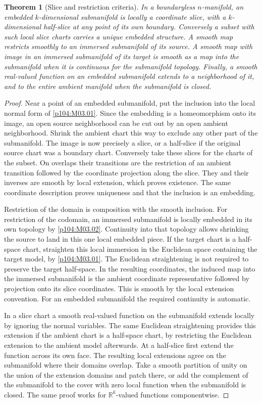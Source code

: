 \documentclass[11pt,oneside,openany]{book}
\newtheorem{theorem}{Theorem}[chapter]
\theoremstyle{definition}
\theoremstyle{remark}
\newcommand{\R}{\mathbb R}
\begin{document}
\begin{theorem}[Slice and restriction criteria]\label{p104:M03.04}
In a boundaryless \(n\)-manifold, an embedded
\(k\)-dimensional submanifold is locally a coordinate
slice, with a \(k\)-dimensional half-slice at any point
of its own boundary. Conversely a subset with such
local slice charts carries a unique embedded structure.
A smooth map restricts smoothly to an immersed
submanifold of its source. A smooth map with image in
an immersed submanifold of its target is
smooth as a map into the submanifold when it is
continuous for the submanifold topology. Finally,
a smooth real-valued function on an embedded
submanifold
extends to a neighborhood of it, and to the entire
ambient manifold when the submanifold is closed.
\end{theorem}

\begin{proof}
Near a point of an embedded submanifold, put the
inclusion into the local normal form of
\cref{p104:M03.01}. Since the embedding is a
homeomorphism onto its image, an open source
neighborhood can be cut out by an open ambient
neighborhood. Shrink the ambient chart this way
to exclude any other part of the submanifold.
The image is now precisely a slice, or a half-slice
if the original source chart was a boundary chart.
Conversely take these slices for the charts of the
subset. On overlaps their transitions are the
restriction of an ambient transition followed
by the coordinate projection along the slice.
They and their inverses are smooth by local
extension, which proves existence. The same
coordinate description proves uniqueness and
that the inclusion is an embedding.

Restriction of the domain is composition with the
smooth inclusion. For restriction of the codomain,
an immersed submanifold is locally embedded in its
own topology by \cref{p104:M03.02}. Continuity into
that topology allows shrinking the source to land
in this one local embedded piece. If the target
chart is a half-space chart, straighten this local
immersion in the Euclidean space containing the
target model, by \cref{p104:M03.01}. The Euclidean
straightening is not required to preserve the
target half-space. In the resulting coordinates,
the induced map into the immersed submanifold is
the ambient coordinate representative followed
by projection onto its slice coordinates. This is
smooth by the local extension convention. For an
embedded submanifold the required continuity is
automatic.

In a slice chart a smooth real-valued function on
the submanifold extends locally by ignoring the
normal variables. The same Euclidean straightening
provides this extension if the ambient chart is
a half-space chart, by restricting the Euclidean
extension to the ambient model afterwards. At a
half-slice first extend the function across its own
face. The resulting local extensions agree on
the submanifold where their domains overlap. Take a
smooth partition of unity on the union of the
extension domains and patch there, or add the
complement of the submanifold to the cover with
zero local function when the submanifold is closed.
The same proof works for \(\R^k\)-valued functions
componentwise.
\end{proof}
\end{document}
